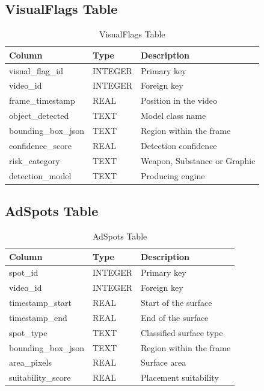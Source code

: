 \documentclass[12pt,a4paper,twoside]{report}
\begin{document}
\subsection{VisualFlags Table}

\begin{table}[h]
\centering
\begin{tabular}{|p{4cm}|p{2.5cm}|p{5cm}|}
\hline
\textbf{Column} & \textbf{Type} & \textbf{Description} \\
\hline
visual\_flag\_id & INTEGER & Primary key \\
\hline
video\_id & INTEGER & Foreign key \\
\hline
frame\_timestamp & REAL & Position in the video \\
\hline
object\_detected & TEXT & Model class name \\
\hline
bounding\_box\_json & TEXT & Region within the frame \\
\hline
confidence\_score & REAL & Detection confidence \\
\hline
risk\_category & TEXT & Weapon, Substance or Graphic \\
\hline
detection\_model & TEXT & Producing engine \\
\hline
\end{tabular}
\caption{VisualFlags Table}
\end{table}

\subsection{AdSpots Table}

\begin{table}[h]
\centering
\begin{tabular}{|p{4cm}|p{2.5cm}|p{5cm}|}
\hline
\textbf{Column} & \textbf{Type} & \textbf{Description} \\
\hline
spot\_id & INTEGER & Primary key \\
\hline
video\_id & INTEGER & Foreign key \\
\hline
timestamp\_start & REAL & Start of the surface \\
\hline
timestamp\_end & REAL & End of the surface \\
\hline
spot\_type & TEXT & Classified surface type \\
\hline
bounding\_box\_json & TEXT & Region within the frame \\
\hline
area\_pixels & REAL & Surface area \\
\hline
suitability\_score & REAL & Placement suitability \\
\hline
\end{tabular}
\caption{AdSpots Table}
\end{table}
\end{document}
